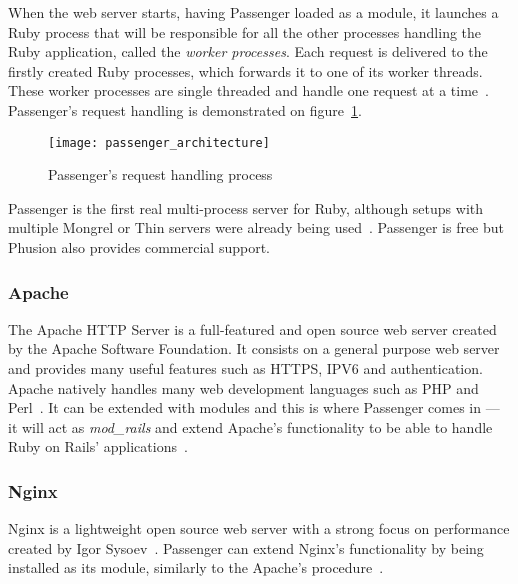 When the web server starts, having Passenger loaded as a module, it launches a Ruby process that will be responsible for all the other processes handling the Ruby application, called the \textit{worker processes}. Each request is delivered to the firstly created Ruby processes, which forwards it to one of its worker threads. These worker processes are single threaded and handle one request at a time~\cite{ruby_webservers}. Passenger's request handling is demonstrated on figure~\ref{fig:passenger_architecture}.
\begin{figure}[h]
  \centering
    \texttt{[image: passenger\_architecture]}
  \caption{Passenger's request handling process}
  \label{fig:passenger_architecture}
\end{figure}
Passenger is the first real multi-process server for Ruby, although setups with multiple Mongrel or Thin servers were already being used~\cite{passenger_whatis}. Passenger is free but Phusion also provides commercial support.


\subsubsection{Apache}
The Apache HTTP Server is a full-featured and open source web server created by the Apache Software Foundation. It consists on a general purpose web server and provides many useful features such as HTTPS, IPV6 and authentication. Apache natively handles many web development languages such as PHP and Perl~\cite{apache_features}. It can be extended with modules and this is where Passenger comes in --- it will act as \textit{mod\_rails} and extend Apache's functionality to be able to handle Ruby on Rails' applications~\cite{passenger_whatis}.


\subsubsection{Nginx}
Nginx is a lightweight open source web server with a strong focus on performance created by Igor Sysoev~\cite{nginx_features}. Passenger can extend Nginx's functionality by being installed as its module, similarly to the Apache's procedure~\cite{passenger_whatis}.
